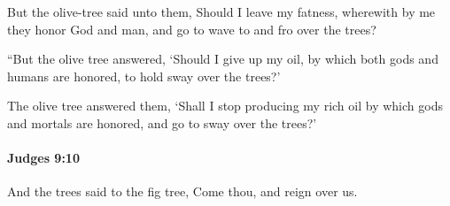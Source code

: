 			\begin{versebox}
					\item[BHS] 
					\item[ASV] But the olive-tree said unto them, Should I leave my fatness, wherewith by me they honor God and man, and go to wave to and fro over the trees?
					\item[NIV] “But the olive tree answered, ‘Should I give up my oil, by which both gods and humans are honored, to hold sway over the trees?’
					\item[NRSV] The olive tree answered them, ‘Shall I stop producing my rich oil by which gods and mortals are honored, and go to sway over the trees?’
			\end{versebox}

		\paragraph{Judges 9:10} %
			\label{JUDGES-9-10}

			And the trees said to the fig tree, Come thou, and reign over us.

